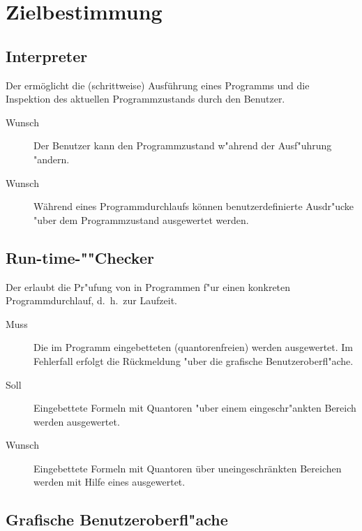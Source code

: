 \section{Zielbestimmung}%


\subsection{Interpreter}%

Der  ermöglicht die (schrittweise) Ausführung eines Programms und die Inspektion des aktuellen Programmzustands durch den Benutzer.%

\begin{description}%
    \item[Wunsch] Der Benutzer kann den Programmzustand w"ahrend der Ausf"uhrung "andern.%
    \item[Wunsch] Während eines Programmdurchlaufs können benutzerdefinierte Ausdr"ucke "uber dem Programmzustand ausgewertet werden.%
\end{description}%

\subsection{Run-time-""Checker}%

Der  erlaubt die Pr"ufung von  in Programmen f"ur einen konkreten Programmdurchlauf, d.~h.\ zur Laufzeit.%

\begin{description}%
    \item [Muss] Die im Programm eingebetteten (quantorenfreien)  werden ausgewertet. Im Fehlerfall erfolgt die Rückmeldung "uber die grafische Benutzeroberfl"ache.
    \item [Soll] Eingebettete Formeln mit Quantoren "uber einem eingeschr"ankten Bereich werden ausgewertet.%
    \item [Wunsch] Eingebettete Formeln mit Quantoren über uneingeschränkten Bereichen werden mit Hilfe eines  ausgewertet.
\end{description}%

\subsection{Grafische Benutzeroberfl"ache}%


